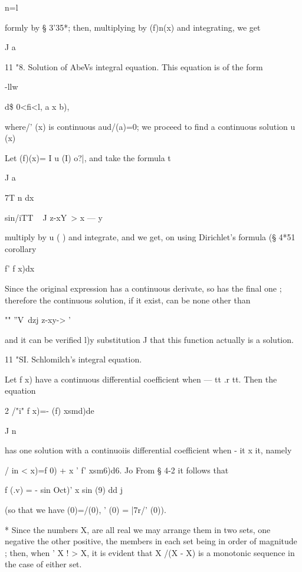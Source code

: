 {n=l

formly by § 3'35*; then, multiplying by (f)n(x) and integrating, we
get

J a



11 "8. Solution of AbeVs integral equation. This equation is of the
form



  -llw



d\$ 0<fi<l, a x b),



where/' (x) is continuous aud/(a)=0; we proceed to find a continuous
solution u (x)



Let (f)(x)= I u (I) o?|, and take the formula t

J a

7T n dx

sin/iTT ~ J z-xY~> x — y



multiply by u ( ) and integrate, and we get, on using Dirichlet's
formula (§ 4*51 corollary\

  f' f x)dx

Since the original expression has a continuous derivate, so has the
final one ; therefore the continuous solution, if it exist, can be
none other than

"" ''V~dzj z-xy-> '

and it can be verified l)y substitution J that this function actually
is a solution.

11 "SI. Schlomilch's integral equation.

Let f x) have a continuous differential coefficient when — tt .r tt.
Then the equation

2 /"i" f x)=- (f) xsmd)de

  J n

has one solution with a continuoiis differential coefficient when - it
x it, namely

/ in < x)=f 0) + x ' f' xsm6)d6. Jo From § 4-2 it follows that

f (.v) = - sin Oct)' x sin (9) dd j

(so that we have (0)=/(0), ' (0) = |7r/' (0)).

* Since the numbers X, are all real we may arrange them in two sets,
one negative the other positive, the members in each set being in
order of magnitude ; then, when ' X ! > X, it is evident that X /(X -
X) is a monotonic sequence in the case of either set.

}
